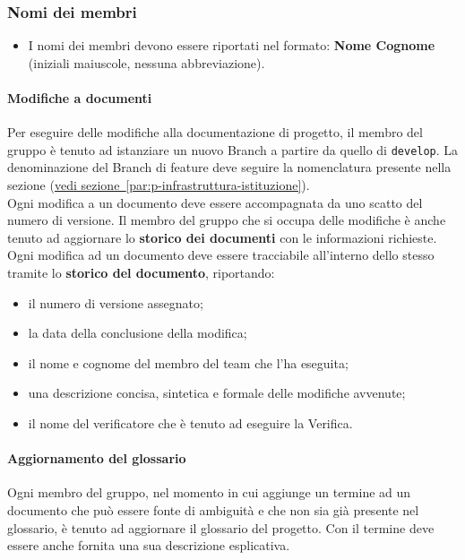 \documentclass[a4paper,12pt]{article}
\begin{document}
\subsubsection*{Nomi dei membri}
\begin{itemize}
    \item I nomi dei membri devono essere riportati nel formato: \textbf{Nome Cognome} (iniziali maiuscole, nessuna abbreviazione).
\end{itemize}

\paragraph{Modifiche a documenti}
Per eseguire delle modifiche alla documentazione di progetto, il membro del gruppo è tenuto ad istanziare un nuovo Branch a partire da quello di \texttt{develop}. La denominazione del Branch di feature deve seguire la nomenclatura presente nella sezione (\hyperref[par:p-infrastruttura-istituzione]{vedi sezione~\ref*{par:p-infrastruttura-istituzione}}).
\\Ogni modifica a un documento deve essere accompagnata da uno scatto del numero di versione. Il membro del gruppo che si occupa delle modifiche è anche tenuto ad aggiornare lo \textbf{storico dei documenti} con le informazioni richieste.\\ 
Ogni modifica ad un documento deve essere tracciabile all’interno dello stesso tramite lo \textbf{storico del documento}, riportando:
  \begin{itemize}
      \item il numero di versione assegnato;
      \item la data della conclusione della modifica;
      \item il nome e cognome del membro del team che l'ha eseguita;
      \item una descrizione concisa, sintetica e formale delle modifiche avvenute;
      \item il nome del verificatore che è tenuto ad eseguire la Verifica.
  \end{itemize}

\paragraph{Aggiornamento del glossario}
Ogni membro del gruppo, nel momento in cui aggiunge un termine ad un documento che può essere fonte di ambiguità e che non sia già presente nel glossario, è tenuto ad aggiornare il glossario del progetto. Con il termine deve essere anche fornita una sua descrizione esplicativa.
\end{document}
